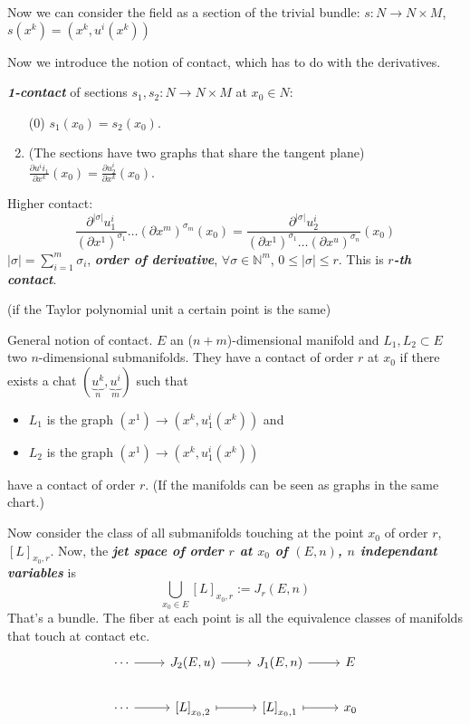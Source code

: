 Now we can consider the field as a section of the trivial bundle: $s:N \to N\times M$, $s(x^k)=(x^k,u^i(x^k))$

Now we introduce the notion of contact, which has to do with the derivatives.

\textit{\textbf{1-contact}} of sections $s_1,s_2:N \to N \times M$ at $x_0  \in N$:
\begin{enumerate}
	\item[(0)] $s_1(x_0)=s_2(x_0)$.
	\item (The sections have two graphs that share the tangent plane) $\frac{\partial u^ii_1}{\partial x^k}(x_0)=\frac{\partial u^i_2}{\partial x^k}(x_0)$.
\end{enumerate}

Higher contact:
\[\frac{\partial^{|\sigma|}u^i_1}{(\partial x^1)^{\sigma_1}}\ldots(\partial x^m)^{\sigma_m}(x_0)=\frac{\partial^{|\sigma|}u_2^i}{(\partial x^1)^{\sigma_1}\ldots(\partial x^u)^{\sigma_n}}(x_0)\]
$|\sigma|=\sum_{i=1}^m \sigma_i$, \textit{\textbf{order of derivative}},  $\forall  \sigma \in \mathbb{N}^m$, $0\leq  | \sigma|\leq  r$. This is \textit{\textbf{$r$-th contact}}.

(if the Taylor polynomial unit a certain point is the same)

General notion of contact. $E$ an  ($n+m$)-dimensional manifold and  $L_1,L_2 \subset E$ two $n$-dimensional submanifolds. They have a contact of order $r$ at $x_0$ if there exists a chat $(\underbrace{u^k}_{n},\underbrace{u^i}_{m})$ such that
\begin{itemize}
\item $L_1$ is the graph $(x^1)\to (x^k,u^i_1(x^k))$ and
\item $L_2$ is the graph $(x^1) \to (x^k,u^i_1(x^k))$
\end{itemize}
have a contact of order $r$. (If the manifolds can be seen as graphs in the same chart.)

Now consider the class of all submanifolds touching at the point $x_0$ of order $r$, $[L]_{x_0,r}$. Now, the \textit{\textbf{jet space of order $r$ at $x_0$ of $(E,n)$, $n$ independant variables}} is
\[\bigcup_{x_0 \in E}[L]_{x_0,r}:=J_r(E,n) \]
That's a bundle. The fiber at each point is all the equivalence classes of manifolds that touch at contact etc.
\[\begin{tikzcd}
	\cdots \arrow[r]&J_2(E,u)\arrow[r]& J_1(E,n) \arrow[ r] & E\\
	\cdots \arrow[ r ]&  \left[L\right]_{x_0,2}\arrow[r, maps to] &  \left[L\right]_{x_0,1}\arrow[r,maps to]& x_0
\end{tikzcd}\]

